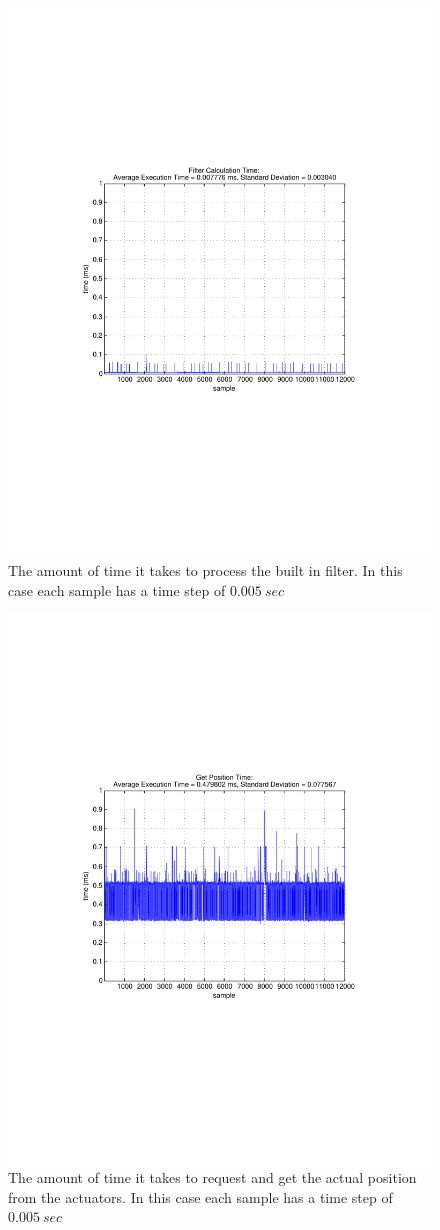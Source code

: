 \begin{itemize}
\begin{figure}[thpb]
  \centering
\includegraphics[width=0.6\columnwidth]{./timingData/filter.pdf}
  \caption{The amount of time it takes to process the built in filter.  In this case each sample has a time step of $0.005~sec$}
  \label{fig:timing-filter}
\end{figure}










\begin{figure}[thpb]
  \centering
\includegraphics[width=0.6\columnwidth]{./timingData/getPos.pdf}
  \caption{The amount of time it takes to request and get the actual position from the actuators.  In this case each sample has a time step of $0.005~sec$}
  \label{fig:timing-getPos}
\end{figure}


\end{itemize}
